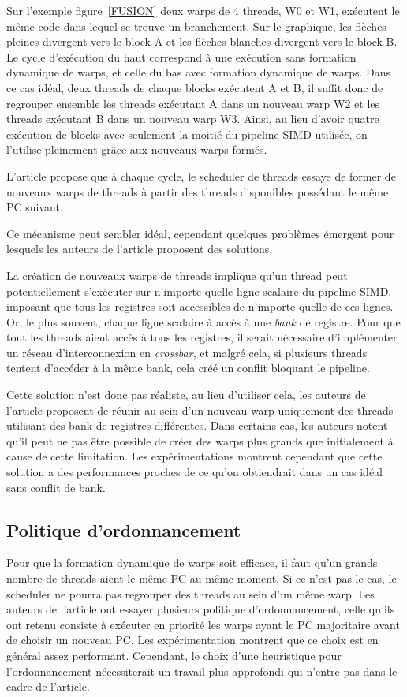 \documentclass[11pt]{article}
\begin{document}
Sur l'exemple figure~\ref{FUSION} deux warps de 4 threads, W0 et W1, exécutent le même code dans lequel se trouve un branchement.
Sur le graphique, les flèches pleines divergent vers le block A et les flèches blanches divergent vers le block B.
Le cycle d'exécution du haut correspond à une exécution sans formation dynamique de warps, et celle du bas avec formation dynamique de warps.
Dans ce cas idéal, deux threads de chaque blocks exécutent A et B, il suffit donc de regrouper ensemble les threads exécutant A dans un nouveau warp W2 et les threads exécutant B dans un nouveau warp W3.
Ainsi, au lieu d'avoir quatre exécution de blocks avec seulement la moitié du pipeline SIMD utilisée, on l'utilise pleinement grâce aux nouveaux warps formés.

L'article propose que à chaque cycle, le scheduler de threads essaye de former de nouveaux warps de threads à partir des threads disponibles possédant le même PC suivant.

Ce mécanisme peut sembler idéal, cependant quelques problèmes émergent pour lesquels les auteurs de l'article proposent des solutions.

La création de nouveaux warps de threads implique qu'un thread peut potentiellement s'exécuter sur n'importe quelle ligne scalaire du pipeline SIMD, imposant que tous les registres soit accessibles de n'importe quelle de ces lignes. Or, le plus souvent, chaque ligne scalaire à accès à une \emph{bank} de registre.
Pour que tout les threads aient accès à tous les registres, il serait nécessaire d'implémenter un réseau d'interconnexion en \emph{crossbar}, et malgré cela, si plusieurs threads tentent d'accéder à la même bank, cela créé un conflit bloquant le pipeline.

Cette solution n'est donc pas réaliste, au lieu d'utiliser cela, les auteurs de l'article proposent de réunir au sein d'un nouveau warp uniquement des threads utilisant des bank de registres différentes. 
Dans certains cas, les auteurs notent qu'il peut ne pas être possible de créer des warps plus grands que initialement à cause de cette limitation.
Les expérimentations montrent cependant que cette solution a des performances proches de ce qu'on obtiendrait dans un cas idéal sans conflit de bank.

\subsection{Politique d'ordonnancement}

Pour que la formation dynamique de warps soit efficace, il faut qu'un grands nombre de threads aient le même PC au même moment. Si ce n'est pas le cas, le scheduler ne pourra pas regrouper des threads au sein d'un même warp.
Les auteurs de l'article ont essayer plusieurs politique d'ordonnancement, celle qu'ils ont retenu consiste à exécuter en priorité les warps ayant le PC majoritaire avant de choisir un nouveau PC. Les expérimentation montrent que ce choix est en général assez performant.
Cependant, le choix d'une heuristique pour l'ordonnancement nécessiterait un travail plus approfondi qui n'entre pas dans le cadre de l'article.
\end{document}

